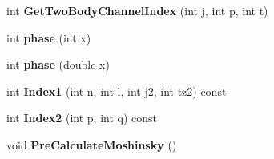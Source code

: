 \begin{DoxyCompactItemize}
\item 
\hypertarget{classModelSpace_ae73e211248e6f2bd4cc1bb0f030144ce}{int {\bfseries Get\-Two\-Body\-Channel\-Index} (int j, int p, int t)}\label{classModelSpace_ae73e211248e6f2bd4cc1bb0f030144ce}

\item 
\hypertarget{classModelSpace_a6b4d1686088e3fef492df10bbd806fe2}{int {\bfseries phase} (int x)}\label{classModelSpace_a6b4d1686088e3fef492df10bbd806fe2}

\item 
\hypertarget{classModelSpace_a07d1c8f00131cc6c192d440e6be329f3}{int {\bfseries phase} (double x)}\label{classModelSpace_a07d1c8f00131cc6c192d440e6be329f3}

\item 
\hypertarget{classModelSpace_ab9e4a36b032abc3fcd81da8b2a8707d2}{int {\bfseries Index1} (int n, int l, int j2, int tz2) const }\label{classModelSpace_ab9e4a36b032abc3fcd81da8b2a8707d2}

\item 
\hypertarget{classModelSpace_acb31fdcb54a8fe3168378969176f0157}{int {\bfseries Index2} (int p, int q) const }\label{classModelSpace_acb31fdcb54a8fe3168378969176f0157}

\item 
\hypertarget{classModelSpace_abc436144ee034558058227cac872ecb9}{void {\bfseries Pre\-Calculate\-Moshinsky} ()}\label{classModelSpace_abc436144ee034558058227cac872ecb9}

\end{DoxyCompactItemize}
